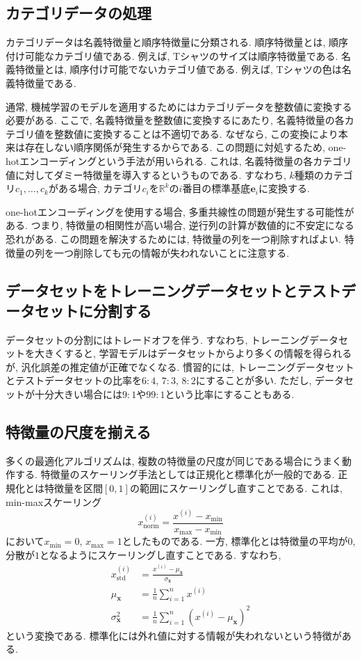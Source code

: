 \documentclass[uplatex]{jsarticle}
\theoremstyle{definition}
\numberwithin{equation}{section}
\newcommand{\R}{\mathbb{R}}
\begin{document}
\subsection{カテゴリデータの処理}
カテゴリデータは名義特徴量と順序特徴量に分類される.
順序特徴量とは, 順序付け可能なカテゴリ値である.
例えば, Tシャツのサイズは順序特徴量である.
名義特徴量とは, 順序付け可能でないカテゴリ値である.
例えば, Tシャツの色は名義特徴量である.

通常, 機械学習のモデルを適用するためにはカテゴリデータを整数値に変換する必要がある.
ここで, 名義特徴量を整数値に変換するにあたり, 名義特徴量の各カテゴリ値を整数値に変換することは不適切である.
なぜなら, この変換により本来は存在しない順序関係が発生するからである.
この問題に対処するため, one-hotエンコーディングという手法が用いられる.
これは, 名義特徴量の各カテゴリ値に対してダミー特徴量を導入するというものである.
すなわち, $k$種類のカテゴリ$c_{1}, \dots, c_{k}$がある場合, カテゴリ$c_{i}$を$\R^{k}$の$i$番目の標準基底$\bm{e}_{i}$に変換する.

one-hotエンコーディングを使用する場合, 多重共線性の問題が発生する可能性がある.
つまり, 特徴量の相関性が高い場合, 逆行列の計算が数値的に不安定になる恐れがある.
この問題を解決するためには, 特徴量の列を一つ削除すればよい.
特徴量の列を一つ削除しても元の情報が失われないことに注意する.

\subsection{データセットをトレーニングデータセットとテストデータセットに分割する}
データセットの分割にはトレードオフを伴う.
すなわち, トレーニングデータセットを大きくすると, 学習モデルはデータセットからより多くの情報を得られるが, 汎化誤差の推定値が正確でなくなる.
慣習的には, トレーニングデータセットとテストデータセットの比率を$6:4$, $7:3$, $8:2$にすることが多い.
ただし, データセットが十分大きい場合には$9:1$や$99:1$という比率にすることもある.

\subsection{特徴量の尺度を揃える}
多くの最適化アルゴリズムは, 複数の特徴量の尺度が同じである場合にうまく動作する.
特徴量のスケーリング手法としては正規化と標準化が一般的である.
正規化とは特徴量を区間$[0, 1]$の範囲にスケーリングし直すことである.
これは, min-maxスケーリング
\begin{equation}
    x_{\text{norm}}^{(i)} = \frac{x^{(i)} - x_{\text{min}}}{x_{\text{max}} - x_{\text{min}}}
\end{equation}
において$x_{\text{min}} = 0$, $x_{\text{max}} = 1$としたものである.
一方, 標準化とは特徴量の平均が$0$, 分散が$1$となるようにスケーリングし直すことである.
すなわち, 
\begin{align}
    x_{\text{std}}^{(i)} &= \frac{x^{(i)} - \mu_{\bm{x}}}{\sigma_{\bm{x}}} \\
    \mu_{\bm{x}} &= \frac{1}{n}\sum_{i = 1}^{n} x^{(i)} \\
    \sigma_{\bm{x}}^{2} &= \frac{1}{n}\sum_{i = 1}^{n} (x^{(i)} - \mu_{\bm{x}})^{2}
\end{align}
という変換である.
標準化には外れ値に対する情報が失われないという特徴がある.
\end{document}
